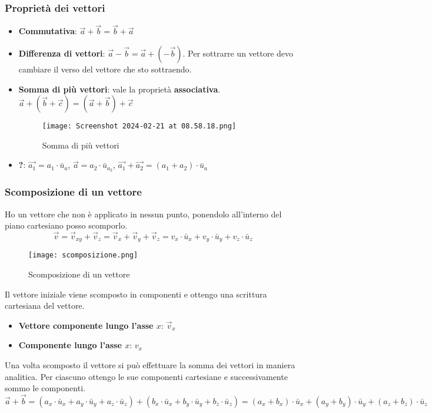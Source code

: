 \documentclass[../../main.tex]{subfiles}
\begin{document}
\subsubsection{Proprietà dei vettori}
\begin{itemize}
    \item \textbf{Commutativa}: $\vec{a} + \vec{b} = \vec{b} + \vec{a}$
    \item \textbf{Differenza di vettori}: $\vec{a} - \vec{b} = \vec{a} + (-\vec{b})$. Per sottrarre un vettore devo cambiare il verso del vettore che sto sottraendo.
    \item \textbf{Somma di più vettori}: vale la proprietà \textbf{associativa}. $\vec{a} + (\vec{b} + \vec{c}) = (\vec{a} + \vec{b}) + \vec{c}$ \begin{figure}
              \centering
              \texttt{[image: Screenshot 2024-02-21 at 08.58.18.png]}
              \caption{Somma di più vettori}
          \end{figure}
    \item \textbf{?}: $\vec{a_1} = a_1 \cdot \bar{u}_{a}$, $\vec{a} = a_2 \cdot \bar{u}_{a_2}$, $\vec{a_1} + \vec{a_2} = (a_1 + a_2) \cdot \bar{u}_{a}$
\end{itemize}
\subsubsection{Scomposizione di un vettore}
Ho un vettore che non è applicato in nessun punto, ponendolo all'interno del piano cartesiano posso scomporlo.
\[
    \vec{v} = \vec{v}_{xy} + \vec{v}_{z} = \vec{v}_{x} + \vec{v}_{y} + \vec{v}_{z} = v_x \cdot \bar{u}_x + v_y \cdot \bar{u}_y + v_z \cdot \bar{u}_z
\]
\begin{figure}[h!]
    \centering
    \texttt{[image: scomposizione.png]}
    \caption{Scomposizione di un vettore}
\end{figure}

Il vettore iniziale viene scomposto in componenti e ottengo una scrittura cartesiana del vettore.
\begin{itemize}
    \item \textbf{Vettore componente lungo l'asse $x$}: $\vec{v}_x$
    \item \textbf{Componente lungo l'asse $x$}: $v_x$
\end{itemize}
Una volta scomposto il vettore si può effettuare la somma dei vettori in maniera analitica. Per ciascuno ottengo le sue componenti cartesiane e successivamente sommo le componenti.
\[
    \vec{a} + \vec{b} = (a_x \cdot \bar{u}_x + a_y \cdot \bar{u}_y + a_z \cdot \bar{u}_z) + (b_x \cdot \bar{u}_x + b_y \cdot \bar{u}_y + b_z \cdot \bar{u}_z) = (a_x + b_x) \cdot \bar{u}_x + (a_y + b_y) \cdot \bar{u}_y + (a_z + b_z) \cdot \bar{u}_z
\]
\end{document}
